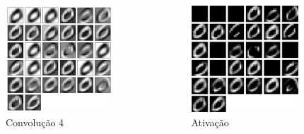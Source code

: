 \documentclass[tikz,10pt]{beamer}
\begin{document}
\begin{frame}
\begin{columns}
		\begin{column}{0.33\textwidth}
			\begin{figure}
				\includegraphics[height=4cm]{images/resultados/network_1/input_1_layer_convolution2d_4}
				\caption{Convolução 4}
			\end{figure}%
		\end{column}
		\begin{column}{0.33\textwidth}
			\begin{figure}
				\includegraphics[height=4cm]{images/resultados/network_1/input_1_layer_activation_4}%
				\caption{Ativação}			
			\end{figure}%
		\end{column}	
	\end{columns}
	
\end{frame}
\end{document}
